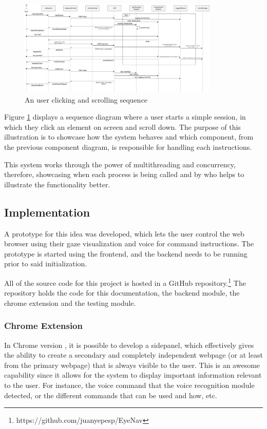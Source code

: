 \begin{figure}[ht]
    \centering
    \includegraphics[width=0.85\textwidth]{images/sequence-diagram.jpg}
    \caption{An user clicking and scrolling sequence}
    \label{fig:sequence-diagram}
\end{figure}

Figure \ref{fig:sequence-diagram} displays a sequence diagram where a user starts a simple session, in which they click an element on screen and scroll down. The purpose of this illustration is to showcase how the system behaves and which component, from the previous component diagram, is responsible for handling each instructions. 

This system works through the power of multithreading and concurrency, therefore, showcasing when each process is being called and by who helps to illustrate the functionality better.


\subsection{Implementation}
A prototype for this idea was developed, which lets the user control the web browser using their gaze visualization and voice for command instructions. The prototype is started using the frontend, and the backend needs to be running prior to said initialization. 

All of the source code for this project is hosted in a GitHub repository.\footnote{https://github.com/juanyepesp/EyeNav} The repository holds the code for this documentation, the backend module, the chrome extension and the testing module.

\subsubsection{Chrome Extension}
In Chrome version %
, it is possible to develop a sidepanel, which effectively gives the ability to create a secondary and completely independent webpage (or at least from the primary webpage) that is always visible to the user. This is an awesome capability since it allows for the system to display important information relevant to the user. For instance, the voice command that the voice recognition module detected, or the different commands that can be used and how, etc.

